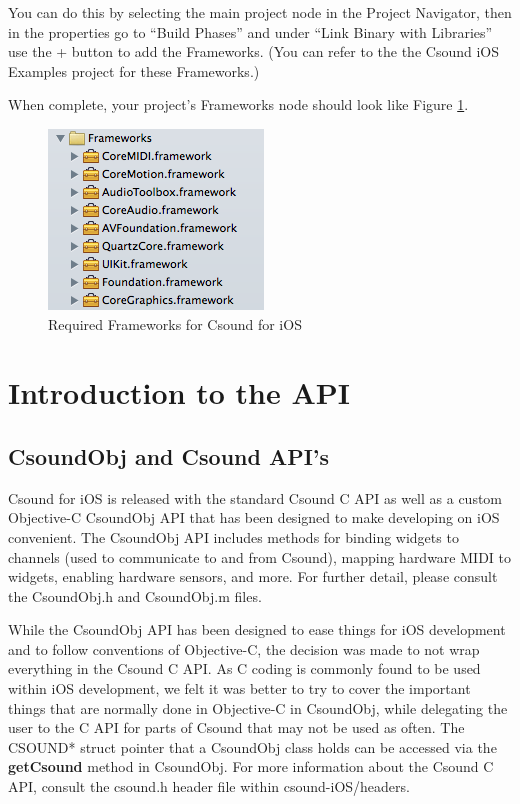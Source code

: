 \documentclass[11pt]{article}
\begin{document}
You can do this by selecting the main project node in the Project Navigator, then in the properties go to ``Build Phases'' and under ``Link Binary with Libraries'' use the + button to add the Frameworks. (You can refer to the the Csound iOS Examples project for these Frameworks.)

When complete, your project's Frameworks node should look like Figure \ref{fig:frameworks}.

\begin{figure}[ht]
\begin{center}
\includegraphics{images/frameworks}
\end{center}
\caption{Required Frameworks for Csound for iOS}\label{fig:frameworks}
\end{figure}


\section{Introduction to the API}
\subsection{CsoundObj and Csound API's}

Csound for iOS is released with the standard Csound C API as well as a custom Objective-C CsoundObj API that has been designed to make developing on iOS convenient.  The CsoundObj API includes methods for binding widgets to channels (used to communicate to and from Csound), mapping hardware MIDI to widgets, enabling hardware sensors, and more.  For further detail, please consult the CsoundObj.h and CsoundObj.m files.

While the CsoundObj API has been designed to ease things for iOS development and to follow conventions of Objective-C, the decision was made to not wrap everything in the Csound C API.  As C coding is commonly found to be used within iOS development, we felt it was better to try to cover the important things that are normally done in Objective-C in CsoundObj, while delegating the user to the C API for parts of Csound that may not be used as often.  The CSOUND* struct pointer that a CsoundObj class holds can be accessed via the \textbf{getCsound} method in CsoundObj.  For more information about the Csound C API, consult the csound.h header file within csound-iOS/headers.
\end{document}

